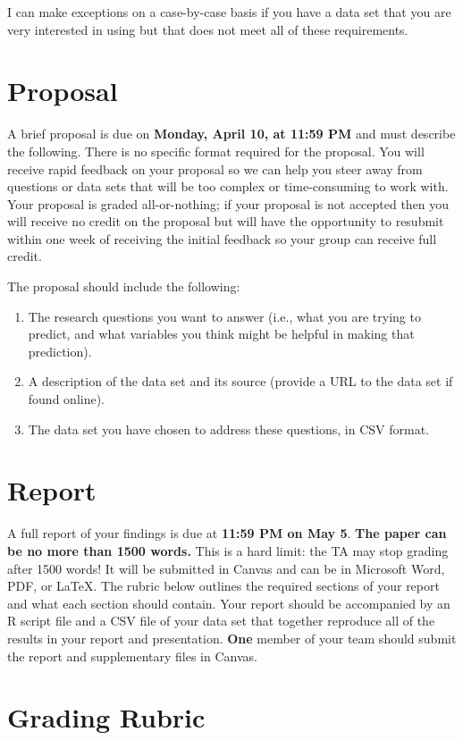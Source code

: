 \documentclass[12pt]{article}
\begin{document}
I can make exceptions on a case-by-case basis if you have a data set that you are very interested in using but that does not meet all of these requirements.

\section{Proposal}

A brief proposal is due on \textbf{Monday, April 10, at 11:59 PM} and must describe the following. There is no specific format required for the proposal. You will receive rapid feedback on your proposal so we can help you steer away from questions or data sets that will be too complex or time-consuming to work with. Your proposal is graded all-or-nothing; if your proposal is not accepted then you will receive no credit on the proposal but will have the opportunity to resubmit within one week of receiving the initial feedback so your group can receive full credit.

The proposal should include the following:
\begin{enumerate}
  \item The research questions you want to answer (i.e., what you are trying to predict, and what variables you think might be helpful in making that prediction).
  \item A description of the data set and its source (provide a URL to the data set if found online).
  \item The data set you have chosen to address these questions, in CSV format.
\end{enumerate}

\section{Report}

A full report of your findings is due at \textbf{11:59 PM on May 5}.  \textbf{The paper can be no more than 1500 words.}  This is a hard limit: the TA may stop grading after 1500 words!  It will be submitted in Canvas and can be in Microsoft Word, PDF, or \LaTeX.  The rubric below outlines the required sections of your report and what each section should contain.  Your report should be accompanied by an R script file and a CSV file of your data set that together reproduce all of the results in your report and presentation. \textbf{One} member of your team should submit the report and supplementary files in Canvas.  

\section{Grading Rubric}
\end{document}
